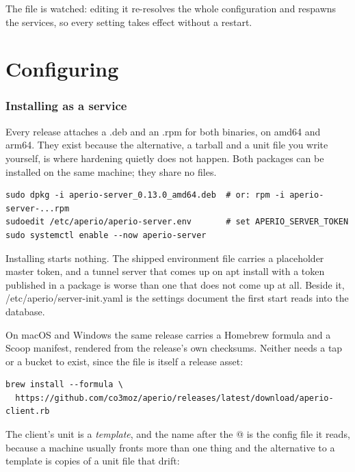 \documentclass[11pt,a4paper,oneside]{book}
\newcommand{\aperiobreakableunderscore}{\textunderscore\allowbreak}
\newcommand{\aperiocodebreaks}{\XeTeXinterchartokenstate=1 }
\newcommand{\aperiocodebreaks}{}
\DeclareRobustCommand{\code}[1]{{\ttfamily\small\aperiocodebreaks
  \let\_\aperiobreakableunderscore#1}}
\begin{document}
The file is watched: editing it re-resolves the whole configuration and
respawns the services, so every setting takes effect without a restart.

\part{Configuring}

\section{Installing as a service}

Every release attaches a \code{.deb} and an \code{.rpm} for both binaries, on
amd64 and arm64. They exist because the alternative, a tarball and a unit file
you write yourself, is where hardening quietly does not happen. Both packages
can be installed on the same machine; they share no files.

\begin{lstlisting}[language=aperiosh]
sudo dpkg -i aperio-server_0.13.0_amd64.deb  # or: rpm -i aperio-server-...rpm
sudoedit /etc/aperio/aperio-server.env       # set APERIO_SERVER_TOKEN
sudo systemctl enable --now aperio-server
\end{lstlisting}

Installing starts nothing. The shipped environment file carries a
placeholder master token, and a tunnel server that comes up on
\code{apt install} with a token published in a package is worse than one
that does not come up at all. Beside it, \code{/etc/aperio/server-init.yaml}
is the settings document the first start reads into the database.

On macOS and Windows the same release carries a Homebrew formula and a Scoop
manifest, rendered from the release's own checksums. Neither needs a tap or a
bucket to exist, since the file is itself a release asset:

\begin{lstlisting}[language=aperiosh]
brew install --formula \
  https://github.com/co3moz/aperio/releases/latest/download/aperio-client.rb
\end{lstlisting}

The client's unit is a \emph{template}, and the name after the \code{@} is the
config file it reads, because a machine usually fronts more than one thing and
the alternative to a template is copies of a unit file that drift:
\end{document}
